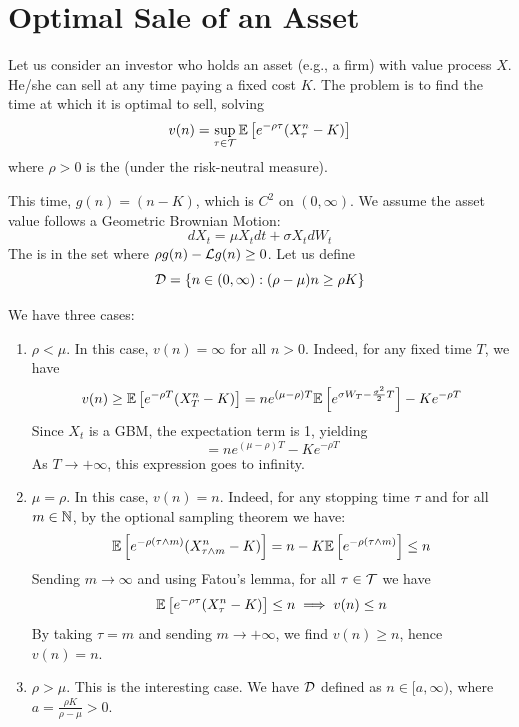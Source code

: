 \section{Optimal Sale of an Asset}

\begin{remark}
    Let us consider an investor who holds an asset (e.g., a firm) with value process $X$. He/she can sell at any time paying a fixed cost $K$. The problem is to find the time at which it is optimal to sell, solving
    \[ v(n) = \sup_{\tau \in \mathcal{T}} \mathbb E \left[ e^{-\rho \tau} (X_\tau^n - K) \right] \]
    where $\rho > 0$ is the  (under the risk-neutral measure).
    
    This time, $g(n) = (n - K)$, which is $C^2$ on $(0, \infty)$. We assume the asset value follows a Geometric Brownian Motion:
    \[ dX_t = \mu X_t dt + \sigma X_t dW_t \]
    The  is in the set where $\rho g(n) - \mathcal{L}g(n) \geq 0$. Let us define
    \[ \mathcal{D} = \{ n \in (0, \infty) : (\rho - \mu)n \geq \rho K \} \]

    We have three cases:
    \begin{enumerate}[label=(\roman*)]
        \item $\rho < \mu$. In this case, $v(n) = \infty$ for all $n > 0$. Indeed, for any fixed time $T$, we have
        \[ v(n) \geq \mathbb E \left[ e^{-\rho T} (X_T^n - K) \right] = n e^{(\mu - \rho)T} \mathbb E \left[ e^{\sigma W_T - \frac{\sigma^2}{2} T} \right] - K e^{-\rho T} \]
        Since $X_t$ is a GBM, the expectation term is 1, yielding
        \[ = n e^{(\mu - \rho)T} - K e^{-\rho T} \]
        As $T \to +\infty$, this expression goes to infinity.
        
        \item $\mu = \rho$. In this case, $v(n) = n$. Indeed, for any stopping time $\tau$ and for all $m \in \mathbb N$, by the optional sampling theorem we have:
        \[ \mathbb E \left[ e^{-\rho (\tau \wedge m)} (X_{\tau \wedge m}^n - K) \right] = n - K \mathbb E \left[ e^{-\rho (\tau \wedge m)} \right] \leq n \]
        Sending $m \to \infty$ and using Fatou's lemma, for all $\tau \in \mathcal{T}$ we have
        \[ \mathbb E \left[ e^{-\rho \tau} (X_\tau^n - K) \right] \leq n \implies v(n) \leq n \]
        By taking $\tau = m$ and sending $m \to +\infty$, we find $v(n) \geq n$, hence $v(n) = n$.
        
        \item $\rho > \mu$. This is the interesting case. We have $\mathcal{D}$ defined as $n \in [a, \infty)$, where $a = \frac{\rho K}{\rho - \mu} > 0$.
        

\end{enumerate}
\end{remark}
